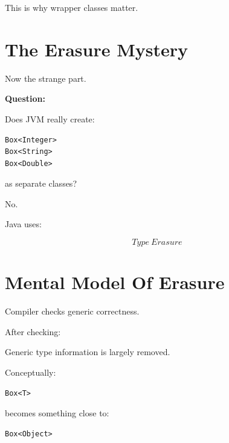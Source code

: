 \documentclass[11pt,a4paper]{book}
\begin{document}

This is why wrapper classes matter.


\section{The Erasure Mystery}

Now the strange part.


\textbf{Question:}

Does JVM really create:

\begin{verbatim}
Box<Integer>
Box<String>
Box<Double>
\end{verbatim}

as separate classes?


No.


Java uses:

\[
Type\ Erasure
\]


\section{Mental Model Of Erasure}

Compiler checks generic correctness.


After checking:

Generic type information is largely removed.


Conceptually:

\begin{verbatim}
Box<T>
\end{verbatim}

becomes something close to:

\begin{verbatim}
Box<Object>
\end{verbatim}
\end{document}
